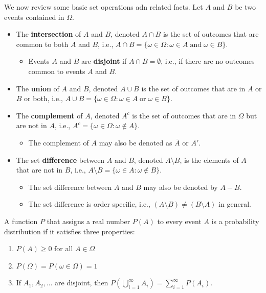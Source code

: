 \documentclass[
]{book}
\providecommand{\tightlist}{%
  \setlength{\itemsep}{0pt}\setlength{\parskip}{0pt}}
\theoremstyle{definition}
\theoremstyle{definition}
\theoremstyle{definition}
\theoremstyle{definition}
\theoremstyle{remark}
\begin{document}
We now review some basic set operations adn related facts. Let \(A\) and \(B\) be two events contained in \(\Omega\).

\begin{itemize}
\tightlist
\item
  The \textbf{intersection} of \(A\) and \(B\), denoted \(A \cap B\) is the set of outcomes that are common to both \(A\) and \(B\), i.e., \(A \cap B = \{\omega \in \Omega: \omega \in A\;\mathrm{and}\;\omega \in B\}\).

  \begin{itemize}
  \tightlist
  \item
    Events \(A\) and \(B\) are \textbf{disjoint} if \(A\cap B = \emptyset\), i.e., if there are no outcomes common to events \(A\) and \(B\).
  \end{itemize}
\item
  The \textbf{union} of \(A\) and \(B\), denoted \(A \cup B\) is the set of outcomes that are in \(A\) or \(B\) or both, i.e., \(A \cup B = \{\omega \in \Omega: \omega \in A\;\mathrm{or}\;\omega \in B\}\).
\item
  The \textbf{complement} of \(A\), denoted \(A^c\) is the set of outcomes that are in \(\Omega\) but are not in \(A\), i.e., \(A^c = \{\omega \in \Omega: \omega \not\in A\}\).

  \begin{itemize}
  \tightlist
  \item
    The complement of \(A\) may also be denoted as \(\overline{A}\) or \(A'\).
  \end{itemize}
\item
  The set \textbf{difference} between \(A\) and \(B\), denoted \(A \setminus B\), is the elements of \(A\) that are not in \(B\), i.e., \(A\setminus B = \{\omega \in A: \omega \not\in B\}\).

  \begin{itemize}
  \tightlist
  \item
    The set difference between \(A\) and \(B\) may also be denoted by \(A-B\).
  \item
    The set difference is order specific, i.e., \((A\setminus B) \not= (B\setminus A)\) in general.
  \end{itemize}
\end{itemize}

A function \(P\) that assigns a real number \(P(A)\) to every event \(A\) is a probability distribution if it satisfies three properties:

\begin{enumerate}
\def\labelenumi{\arabic{enumi}.}
\tightlist
\item
  \(P(A)\geq 0\) for all \(A\in \Omega\)
\item
  \(P(\Omega)=P(\omega \in \Omega) = 1\)
\item
  If \(A_1, A_2, \ldots\) are disjoint, then \(P\left(\bigcup_{i=1}^\infty A_i \right)=\sum_{i=1}^\infty P(A_i)\).
\end{enumerate}
\end{document}
